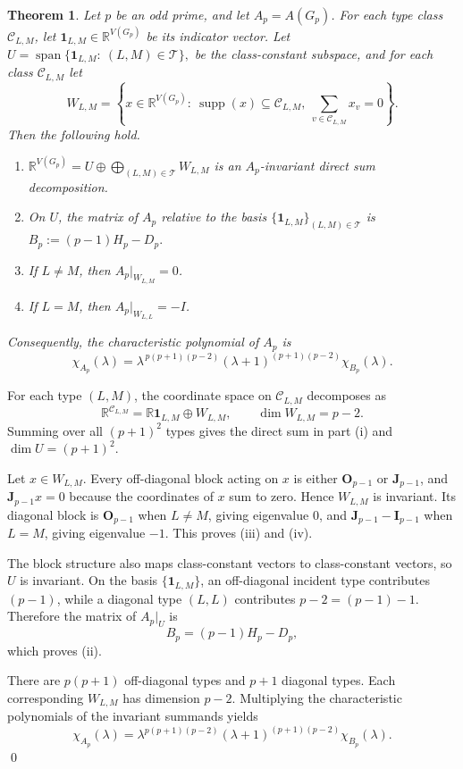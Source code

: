 \documentclass[12pt]{article}
\renewenvironment{proof}{{\bf \noindent Proof.}}{\qed}
\newtheorem{theorem}{Theorem}[section]
\theoremstyle{definition}
\newcommand{\calT}{\mathcal{T}}
\newcommand{\calC}{\mathcal{C}}
\newcommand{\one}{\mathbf{1}}
\newcommand{\I}{\mathbf{I}}
\newcommand{\J}{\mathbf{J}}
\renewcommand{\O}{\mathbf{O}}
\begin{document}
	\begin{theorem}\label{thm:charfactor}
		Let $p$ be an odd prime, and let $A_p=A(G_p)$. For each type class $\calC_{L,M}$, let
		$\one_{L,M}\in \mathbb{R}^{V(G_p)}$ be its indicator vector. Let $U=\operatorname{span}\{\one_{L,M}:\ (L,M)\in \calT\},$ be the class-constant subspace, and for each class $\calC_{L,M}$ let
		$$
		W_{L,M}=\left\{x\in \mathbb{R}^{V(G_p)}:\ \operatorname{supp}(x)\subseteq \calC_{L,M},\ \sum_{v\in \calC_{L,M}}x_v=0\right\}.
		$$
		Then the following hold.
		\begin{enumerate}[label=\textup{(\roman*)},noitemsep]
			\item $\mathbb{R}^{V(G_p)}=U\oplus\bigoplus_{(L,M)\in\calT}W_{L,M}$ is an $A_p$-invariant direct sum decomposition.
			\item On $U$, the matrix of $A_p$ relative to the basis $\{\one_{L,M}\}_{(L,M)\in\calT}$ is $B_p:=(p-1)H_p-D_p.$ 
			\item If $L\neq M$, then $A_p|_{W_{L,M}}=0$.
			\item If $L=M$, then $A_p|_{W_{L,L}}=-I$.
		\end{enumerate}
		Consequently, the characteristic polynomial of $A_p$ is
		$$
		\chi_{A_p}(\lambda)
		=
		\lambda^{\,p(p+1)(p-2)}(\lambda+1)^{(p+1)(p-2)}\chi_{B_p}(\lambda).
		$$
	\end{theorem}
	\begin{proof}
		For each type $(L,M)$, the coordinate space on $\calC_{L,M}$ decomposes as
		$$
		\mathbb R^{\calC_{L,M}}=\mathbb R\one_{L,M}\oplus W_{L,M},
		\qquad \dim W_{L,M}=p-2.
		$$
		Summing over all $(p+1)^2$ types gives the direct sum in part \textup{(i)} and $\dim U=(p+1)^2$.
		
		Let $x\in W_{L,M}$. Every off-diagonal block acting on $x$ is either $\O_{p-1}$ or $\J_{p-1}$, and $\J_{p-1}x=0$ because the coordinates of $x$ sum to zero. Hence $W_{L,M}$ is invariant. Its diagonal block is $\O_{p-1}$ when $L\neq M$, giving eigenvalue $0$, and $\J_{p-1}-\I_{p-1}$ when $L=M$, giving eigenvalue $-1$. This proves \textup{(iii)} and \textup{(iv)}.
		
		The block structure also maps class-constant vectors to class-constant vectors, so $U$ is invariant. On the basis $\{\one_{L,M}\}$, an off-diagonal incident type contributes $(p-1)$, while a diagonal type $(L,L)$ contributes $p-2=(p-1)-1$. Therefore the matrix of $A_p|_U$ is
		$$
		B_p=(p-1)H_p-D_p,
		$$
		which proves \textup{(ii)}.
		
		There are $p(p+1)$ off-diagonal types and $p+1$ diagonal types. Each corresponding $W_{L,M}$ has dimension $p-2$. Multiplying the characteristic polynomials of the invariant summands yields
		$$
		\chi_{A_p}(\lambda)
		=\lambda^{p(p+1)(p-2)}(\lambda+1)^{(p+1)(p-2)}\chi_{B_p}(\lambda).
		$$
	\end{proof}
	
\end{document}
